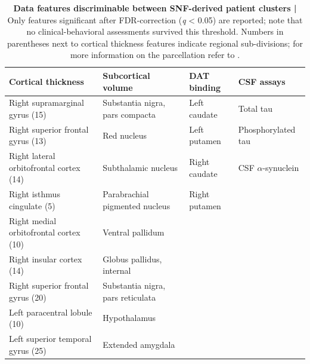 \documentclass[12pt,aps,pra,reprint,showkeys]{revtex4-1}
\begin{document}
\begin{table}[p]
    \caption{
      \textbf{Data features discriminable between SNF-derived patient clusters | }
      Only features significant after FDR-correction (\emph{q} < 0.05) are reported; note that no clinical-behavioral assessments survived this threshold.
      Numbers in parentheses next to cortical thickness features indicate regional sub-divisions; for more information on the parcellation refer to \citep{cammoun2012mapping}.
    }
    \label{supp-table-cluster-features}
    \setlength{\tabcolsep}{5pt}
    \renewcommand{\arraystretch}{1.1}
    \begin{center}
      \begin{tabular}{l l l l}
                                                                                                                                     \toprule
                  \textbf{Cortical thickness} &       \textbf{Subcortical volume} & \textbf{DAT binding} &    \textbf{CSF assays} \\ \midrule
               Right supramarginal gyrus (15) &   Substantia nigra, pars compacta &         Left caudate &              Total tau \\
            Right superior frontal gyrus (13) &                       Red nucleus &         Left putamen &     Phosphorylated tau \\
      Right lateral orbitofrontal cortex (14) &               Subthalamic nucleus &        Right caudate & CSF $\alpha$-synuclein \\
                  Right isthmus cingulate (5) &    Parabrachial pigmented nucleus &        Right putamen &                        \\
       Right medial orbitofrontal cortex (10) &                  Ventral pallidum &                      &                        \\
                    Right insular cortex (14) &         Globus pallidus, internal &                      &                        \\
            Right superior frontal gyrus (20) & Substantia nigra, pars reticulata &                      &                        \\
                 Left paracentral lobule (10) &                      Hypothalamus &                      &                        \\
            Left superior temporal gyrus (25) &                 Extended amygdala &                      &                        \\

\end{tabular}
\end{center}
\end{table}
\end{document}

